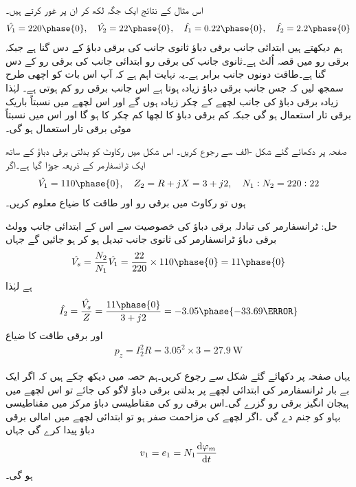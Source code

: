 اس مثال کے نتائج ایک جگہ لکھ کر ان پر غور کرتے ہیں۔
\begin{align*}
\hat{V_1}=220\phase{0}, \quad \hat{V_2}=22\phase{0}, \quad \hat{I_1}=0.22\phase{0}, \quad \hat{I_2}=2.2\phase{0}
\end{align*}
ہم دیکھتے ہیں ابتدائی جانب برقی دباؤ ثانوی جانب کی برقی دباؤ کے دس گنا ہے جبکہ برقی رو میں قصہ اُلٹ ہے۔ثانوی جانب کی برقی رو ابتدائی جانب کی برقی رو کے دس گنا ہے۔طاقت دونوں جانب برابر ہے۔یہ نہایت اہم ہے کہ آپ اس بات کو اچھی طرح سمجھ لیں کہ جس جانب برقی دباؤ زیادہ ہوتا ہے اس جانب برقی رو کم ہوتی ہے۔ لہٰذا زیادہ برقی دباؤ کی جانب لچھے کے چکر زیادہ ہوں گے اور اس لچھے میں نسبتاً باریک برقی تار استعمال ہو گی جبکہ کم برقی دباؤ کا لچھا کم چکر کا ہو گا اور اس میں نسبتاً موٹی برقی تار استعمال ہو گی۔ 

	صفحہ  پر دکھائے گئے شکل -الف سے رجوع کریں۔ اس شکل میں رکاوٹ  کو  بدلتی برقی دباؤ  کے ساتھ ایک ٹرانسفارمر کے ذریعہ جوڑا گیا ہے۔اگر
\begin{align*}
\hat{V_1}=110\phase{0},\quad Z_2=R+j X=3+j 2,\quad N_1:N_2=220:22 
\end{align*}
ہوں تو رکاوٹ میں برقی رو اور طاقت کا ضیاع معلوم کریں۔

حل:
	ٹرانسفارمر کی تبادلہ برقی دباؤ کی خصوصیت سے اس کے ابتدائی جانب  وولٹ برقی دباؤ ٹرانسفارمر کی ثانوی جانب تبدیل ہو کر   ہو جائیں گے جہاں
\begin{align*}
\hat{V_s}=\frac{N_2}{N_1} \hat{V_1}=\frac{22}{220} \times 110\phase{0}=11\phase{0}
\end{align*}
ہے لہٰذا
\begin{align*}
\hat{I_2}=\frac{\hat{V_s}}{Z}=\frac{11\phase{0}}{3+j 2}= -3.05\phase{-33.69\degree}
\end{align*}
اور برقی طاقت کا ضیاع 
\begin{align*}
p_z=I_2^2 R=3.05^2 \times 3=\SI{27.9}{\watt}
\end{align*}

یہاں صفحہ  پر دکھائے گئے  شکل   سے رجوع کریں۔ہم حصہ   میں دیکھ چکے ہیں کہ اگر ایک بے بار ٹرانسفارمر کی ابتدائی لچھے پر بدلتی برقی دباؤ  لاگو کی جائے تو اس لچھے میں ہیجان انگیز برقی رو  گزرے گی۔اس برقی رو کی مقناطیسی دباؤ  مرکز میں مقناطیسی بہاو  کو جنم دے گی ۔اگر لچھے کی مزاحمت صفر ہو تو  ابتدائی لچھے میں  امالی برقی دباؤ پیدا کرے گی جہاں
\begin{align}\label{مساوات_ٹرانسفارمر_دباؤ_برابر_بہاو_تفرق}
v_1=e_1=N_1 \frac{\dif \varphi_m}{\dif t}
\end{align}
ہو گی۔


